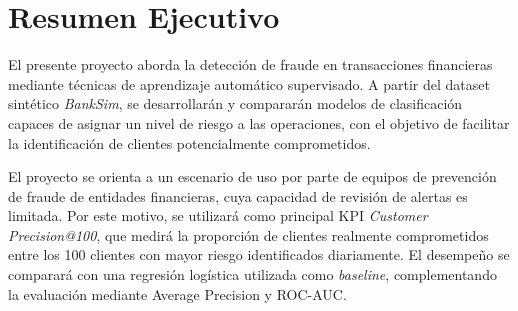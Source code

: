 
\section{Resumen Ejecutivo}

El presente proyecto aborda la detección de fraude en transacciones financieras mediante técnicas de aprendizaje automático supervisado. A partir del dataset sintético \textit{BankSim}, se desarrollarán y compararán modelos de clasificación capaces de asignar un nivel de riesgo a las operaciones, con el objetivo de facilitar la identificación de clientes potencialmente comprometidos.

El proyecto se orienta a un escenario de uso por parte de equipos de prevención de fraude de entidades financieras, cuya capacidad de revisión de alertas es limitada. Por este motivo, se utilizará como principal KPI \textit{Customer Precision@100}, que medirá la proporción de clientes realmente comprometidos entre los 100 clientes con mayor riesgo identificados diariamente. El desempeño se comparará con una regresión logística utilizada como \textit{baseline}, complementando la evaluación mediante Average Precision y ROC-AUC.